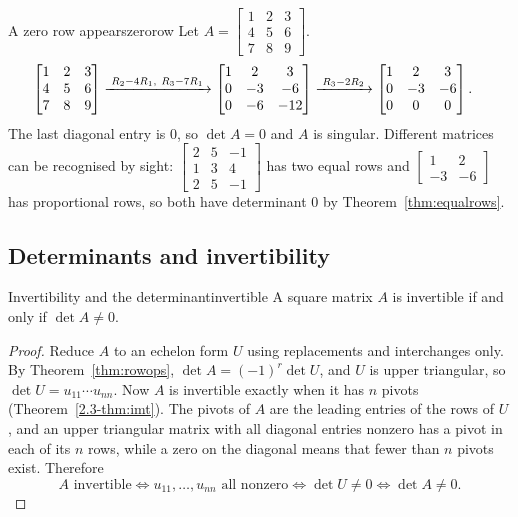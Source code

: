 \documentclass[11pt]{article}
\begin{document}
\begin{exmp}{A zero row appears}{zerorow}
Let $A=\begin{bmatrix}1&2&3\\4&5&6\\7&8&9\end{bmatrix}$.
\begin{align*}
\begin{bmatrix}1&2&3\\4&5&6\\7&8&9\end{bmatrix}
&\xrightarrow{\;R_2-4R_1,\ R_3-7R_1\;}
\begin{bmatrix}1&2&3\\0&-3&-6\\0&-6&-12\end{bmatrix}
\xrightarrow{\;R_3-2R_2\;}
\begin{bmatrix}1&2&3\\0&-3&-6\\0&0&0\end{bmatrix}.
\end{align*}
The last diagonal entry is $0$, so $\det A=0$ and $A$ is singular. Different matrices can be recognised by sight: $\begin{bmatrix}2&5&-1\\1&3&4\\2&5&-1\end{bmatrix}$ has two equal rows and $\begin{bmatrix}1&2\\-3&-6\end{bmatrix}$ has proportional rows, so both have determinant $0$ by Theorem~\ref{thm:equalrows}.
\end{exmp}

\subsection*{Determinants and invertibility}

\begin{thm}{Invertibility and the determinant}{invertible}
A square matrix $A$ is invertible if and only if $\det A\neq0$.
\end{thm}

\begin{proof}
Reduce $A$ to an echelon form $U$ using replacements and interchanges only. By Theorem~\ref{thm:rowops}, $\det A=(-1)^r\det U$, and $U$ is upper triangular, so $\det U=u_{11}\cdots u_{nn}$. Now $A$ is invertible exactly when it has $n$ pivots (Theorem~\ref{2.3-thm:imt}). The pivots of $A$ are the leading entries of the rows of $U$, and an upper triangular matrix with all diagonal entries nonzero has a pivot in each of its $n$ rows, while a zero on the diagonal means that fewer than $n$ pivots exist. Therefore
\[
A\text{ invertible}\iff u_{11},\dots,u_{nn}\text{ all nonzero}\iff\det U\neq0\iff\det A\neq0.
\]
\end{proof}
\end{document}

